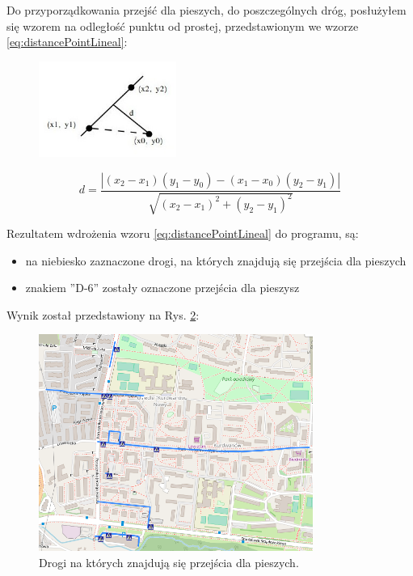Do przyporządkowania przejść dla pieszych, do poszczególnych dróg, posłużyłem się wzorem na odległość punktu od prostej, przedstawionym we wzorze \ref{eq:distancePointLineal}:

\begin{figure}[h]
\label{odlegloscPktProsta}
\centering
\includegraphics[width=0.4\textwidth]{dlugoscPktOdProstej}
\end{figure}


\begin{equation} \label{eq:distancePointLineal}
d = \frac{| (x_2 - x_1)(y_1 - y_0) - (x_1 - x_0)(y_2 - y_1) |}{\sqrt{(x_2 - x_1)^2 + (y_2 - y_1)^2}}
\end{equation}\newline

Rezultatem wdrożenia wzoru \ref{eq:distancePointLineal} do programu, są:
\begin{itemize}
\item na niebiesko zaznaczone drogi, na których znajdują się przejścia dla pieszych
\item znakiem ''D-6'' zostały oznaczone przejścia dla pieszysz
\end{itemize} 
Wynik został przedstawiony na Rys. \ref{sec:PrzejscieDrogi}:

\begin{figure}[h]
\caption{Drogi na których znajdują się przejścia dla pieszych.}
\label{sec:PrzejscieDrogi}
\centering
\includegraphics[width=0.8\textwidth]{PrzejscieDrogi}
\end{figure}


